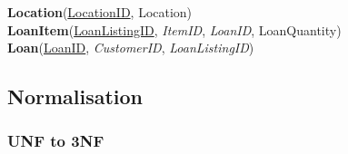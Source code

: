 \noindent \textbf{Location}(\underline{LocationID}, Location)\\

\noindent \textbf{LoanItem}(\underline{LoanListingID}, \emph{ItemID}, \emph{LoanID}, LoanQuantity)\\

\noindent \textbf{Loan}(\underline{LoanID}, \emph{CustomerID}, \emph{LoanListingID})

\subsection{Normalisation}

\subsubsection{UNF to 3NF}


